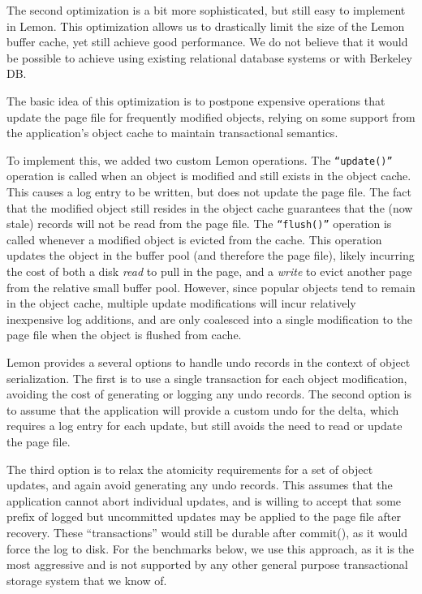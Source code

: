 \documentclass[letterpaper,twocolumn,english]{article}
\newcommand{\yad}{Lemon\xspace}
\begin{document}

The second optimization is a bit more sophisticated, but still easy to
implement in \yad.  This optimization allows us to drastically limit
the size of the
\yad buffer cache, yet still achieve good performance.
We do not believe that it would be possible to
achieve using existing relational database systems or with Berkeley DB.  

The basic idea of this optimization is to postpone expensive
operations that update the page file for frequently modified objects,
relying on some support from the application's object cache
to maintain transactional semantics.

To implement this, we added two custom \yad operations. The
{\tt``update()''} operation is called when an object is modified and
still exists in the object cache. This causes a log entry to be
written, but does not update the page file. The fact that the modified
object still resides in the object cache guarantees that the (now stale)
records will not be read from the page file. The {\tt ``flush()''}
operation is called whenever a modified object is evicted from the
cache. This operation updates the object in the buffer pool (and
therefore the page file), likely incurring the cost of both a disk {\em
read} to pull in the page, and a {\em write} to evict another page
from the relative small buffer pool.  However, since popular 
objects tend to remain in the object cache, multiple update
modifications will incur relatively inexpensive log additions,
and are only coalesced into a single modification to the page file
when the object is flushed from cache.

\yad provides a several options  to handle undo records in the context
of object serialization. The first is to use a single transaction for
each object modification, avoiding the cost of generating or logging
any undo records. The second option is to assume that the
application will provide a custom undo for the delta, 
which requires a log entry for each update, 
but still avoids the need to read or update the page
file.

The third option is to relax the atomicity requirements for a set of
object updates, and again avoid generating any undo records. This
assumes that the application cannot abort individual updates, 
and is willing to
accept that some prefix of logged but uncommitted updates may 
be applied to the page
file after recovery. These ``transactions'' would still be durable
after commit(), as it would force the log to disk. 
For the benchmarks below, we
use this approach, as it is the most aggressive and is
not supported by any other general purpose transactional 
storage system that we know of.
\end{document}
